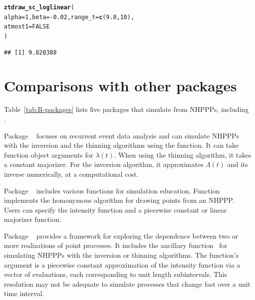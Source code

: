 \documentclass[article,nojss]{jss}\usepackage[]{graphicx}\usepackage[]{xcolor}
\makeatletter
\newcommand{\hlnum}[1]{\textcolor[rgb]{0.686,0.059,0.569}{#1}}%
\newcommand{\hlopt}[1]{\textcolor[rgb]{0,0,0}{#1}}%
\newcommand{\hlstd}[1]{\textcolor[rgb]{0.345,0.345,0.345}{#1}}%
\newcommand{\hlkwc}[1]{\textcolor[rgb]{0.333,0.667,0.333}{#1}}%
\newcommand{\hlkwd}[1]{\textcolor[rgb]{0.737,0.353,0.396}{\textbf{#1}}}%
\newenvironment{kframe}{%
 \def\at@end@of@kframe{}%
 \ifinner\ifhmode%
  \def\at@end@of@kframe{\end{minipage}}%
  \begin{minipage}{\columnwidth}%
 \fi\fi%
 \def\FrameCommand##1{\hskip\@totalleftmargin \hskip-\fboxsep
 \colorbox{shadecolor}{##1}\hskip-\fboxsep
     \hskip-\linewidth \hskip-\@totalleftmargin \hskip\columnwidth}%
 \MakeFramed {\advance\hsize-\width
   \@totalleftmargin\z@ \linewidth\hsize
   \@setminipage}}%
 {\par\unskip\endMakeFramed%
 \at@end@of@kframe}
\newenvironment{knitrout}{}{} %
\newcommand{\fct}[1]{\code{#1()}}
\makeatother
\begin{document}
\begin{knitrout}
\color{fgcolor}\begin{kframe}
\begin{alltt}
\hlkwd{ztdraw_sc_loglinear}\hlstd{(}
  \hlkwc{alpha} \hlstd{=} \hlnum{1}\hlstd{,} \hlkwc{beta} \hlstd{=} \hlopt{-}\hlnum{0.02}\hlstd{,} \hlkwc{range_t} \hlstd{=} \hlkwd{c}\hlstd{(}\hlnum{9.8}\hlstd{,} \hlnum{10}\hlstd{),}
  \hlkwc{atmost1} \hlstd{=} \hlnum{FALSE}
\hlstd{)}
\end{alltt}
\begin{verbatim}
## [1] 9.820388
\end{verbatim}
\end{kframe}
\end{knitrout}


\section[Comparisons with other R packages]{Comparisons with other  packages}\label{sec:other-R-packages}

Table~\ref{tab:R-packages} lists five  packages that simulate from NHPPPs, including .

Package ~\citep{reda-package} focuses on recurrent event data analysis and can simulate NHPPPs with the inversion and the thinning algorithms using the \fct{simEvent} function. It can take function object arguments for $\lambda(t)$. When using the thinning algorithm, it takes a constant majorizer. For the inversion algorithm, it approximates $\Lambda(t)$ and its inverse numerically, at a computational cost.

Package ~\citep{simEd-package} includes various functions for simulation education. Function \fct{thinning} implements the homonymous algorithm for drawing points from an NHPPP. Users can specify the intensity function and a piecewise constant or linear majorizer function.

Package ~\citep{IndTestPP-package} provides a framework for exploring the dependence between two or more realizations of point processes. It includes the ancillary function~\fct{simNHPc} for simulating NHPPPs with the inversion or thinning algorithms. The function's argument is a piecewise constant approximation of the intensity function via a vector of evaluations, each corresponding to unit length subintervals. This resolution may not be adequate to simulate processes that change fast over a unit time interval.
\end{document}
